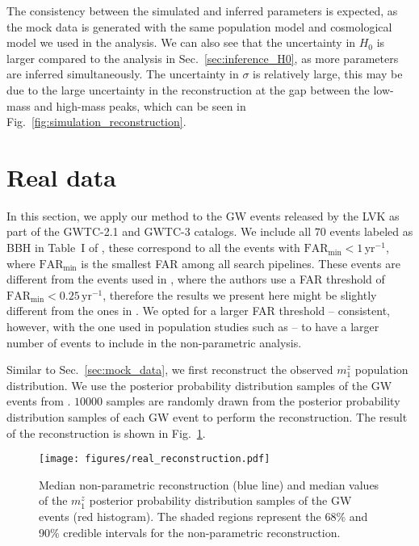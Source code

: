 \documentclass[sn-aps, pdflatex, iicol]{sn-jnl}
\begin{document}
The consistency between the simulated and inferred parameters is expected, as the mock data is generated with the same population model and cosmological model we used in the analysis.
We can also see that the uncertainty in $H_0$ is larger compared to the analysis in Sec.~\ref{sec:inference_H0}, as more parameters are inferred simultaneously.
The uncertainty in $\sigma$ is relatively large, this may be due to the large uncertainty in the reconstruction at the gap between the low-mass and high-mass peaks, which can be seen in 
Fig.~\ref{fig:simulation_reconstruction}.

\section{Real data}
\label{sec:real_data}

In this section, we apply our method to the \ac{GW} events released by the \ac{LVK} as part of the GWTC-2.1 \cite{LIGOScientific:2021usb, ligo_scientific_collaboration_and_virgo_2022_6513631} and GWTC-3 \cite{KAGRA:2021vkt, ligo_scientific_collaboration_and_virgo_2023_8177023} catalogs.
We include all $70$ events labeled as BBH in Table~I of \cite{KAGRA:2021duu}, these correspond to all the events with $\mathrm{FAR_{min}} < 1\, \mathrm{yr}^{-1}$, where $\mathrm{FAR_{min}}$ is the smallest \ac{FAR} among all search pipelines.
These events are different from the events used in \cite{LIGOScientific:2021aug}, where the authors use a \ac{FAR} threshold of $\mathrm{FAR_{min}} < 0.25\, \mathrm{yr}^{-1}$, therefore the results we present here might be slightly different from the ones in \cite{LIGOScientific:2021aug}.
We opted for a larger \ac{FAR} threshold -- consistent, however, with the one used in population studies such as \cite{KAGRA:2021duu} -- to have a larger number of events to include in the non-parametric analysis.

Similar to Sec.~\ref{sec:mock_data}, we first reconstruct the observed $m^z_1$ population distribution.
We use the posterior probability distribution samples of the \ac{GW} events from \cite{LIGOScientific:2019lzm, KAGRA:2023pio}.
$10000$ samples are randomly drawn from the posterior probability distribution samples of each \ac{GW} event to perform the reconstruction.
The result of the reconstruction is shown in Fig.~\ref{fig:real_reconstruction}.
\begin{figure}
    \texttt{[image: figures/real\_reconstruction.pdf]}
    \caption{
        Median non-parametric reconstruction (blue line) and median values of the $m^z_1$ posterior probability distribution samples of the \ac{GW} events (red histogram).
        The shaded regions represent the 68\% and 90\% credible intervals for the non-parametric reconstruction.
    }
    \label{fig:real_reconstruction}
\end{figure}
\end{document}
